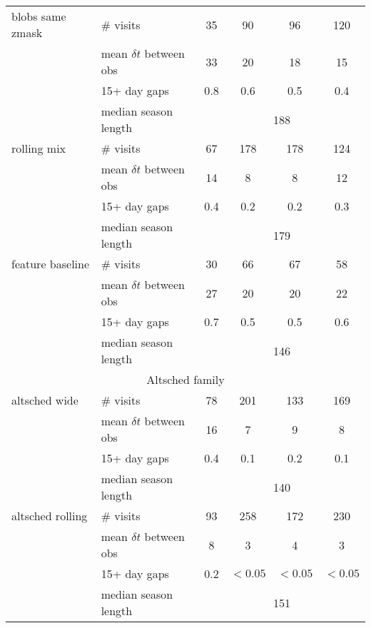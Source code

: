 \begin{appendices}
\begin{longtable}{l|l|cccc}
 blobs same zmask& \# visits                   &  35  & 90   &  96  & 120  \\
                 & mean $\delta t$ between obs &  33  & 20   &  18  &  15  \\
                 & 15+ day gaps                & 0.8  &0.6   & 0.5  & 0.4  \\
                 & median season length               & \multicolumn{4}{c}{188}   \\
  \hline
  
  rolling mix    & \# visits                   &  67  & 178  & 178  & 124  \\
                 & mean $\delta t$ between obs &  14  &   8  &   8  &  12  \\
                 & 15+ day gaps                & 0.4  & 0.2  & 0.2  & 0.3  \\
                 & median season length               & \multicolumn{4}{c}{179}   \\
  \hline

feature baseline & \# visits                   &  30  &  66  &  67  &  58  \\
                 & mean $\delta t$ between obs &  27  &  20  &  20  &  22  \\
                 & 15+ day gaps                & 0.7  & 0.5  & 0.5  & 0.6  \\
                 & median season length               & \multicolumn{4}{c}{146}   \\
  \hline
  \hline
  \multicolumn{6}{c}{Altsched family}\\
  \hline
 altsched wide   & \# visits                   &  78  & 201  & 133  & 169  \\
                 & mean $\delta t$ between obs &  16  &   7  &   9  &   8  \\
                 & 15+ day gaps                & 0.4  & 0.1  & 0.2  & 0.1  \\
                 & median season length               & \multicolumn{4}{c}{140}   \\
  \hline

 altsched rolling& \# visits                   &   93 &  258 & 172  & 230  \\
                 & mean $\delta t$ between obs &    8 &    3 &   4  &   3  \\
                 & 15+ day gaps                &  0.2 & $<0.05$& $<0.05$ &  $<0.05$\\
                 & median season length               & \multicolumn{4}{c}{151}   \\
  \hline


\end{longtable}
\end{appendices}
